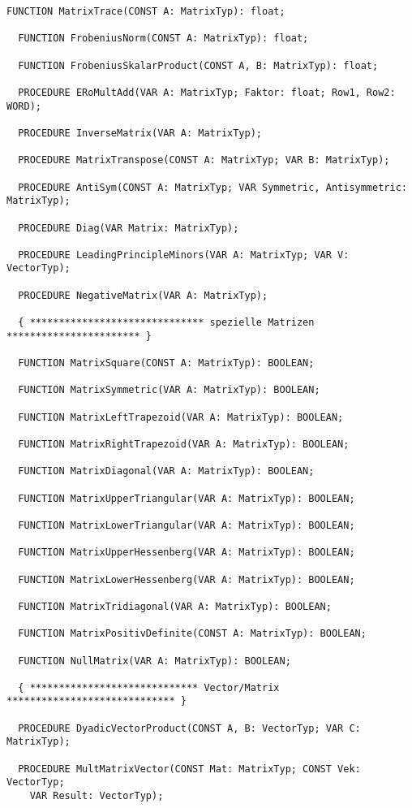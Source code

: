 \begin{refsection}
\begin{lstlisting}[caption=Interface of unit Matrix]
  FUNCTION MatrixTrace(CONST A: MatrixTyp): float;

  FUNCTION FrobeniusNorm(CONST A: MatrixTyp): float;

  FUNCTION FrobeniusSkalarProduct(CONST A, B: MatrixTyp): float;

  PROCEDURE ERoMultAdd(VAR A: MatrixTyp; Faktor: float; Row1, Row2: WORD);

  PROCEDURE InverseMatrix(VAR A: MatrixTyp);

  PROCEDURE MatrixTranspose(CONST A: MatrixTyp; VAR B: MatrixTyp);

  PROCEDURE AntiSym(CONST A: MatrixTyp; VAR Symmetric, Antisymmetric: MatrixTyp);

  PROCEDURE Diag(VAR Matrix: MatrixTyp);

  PROCEDURE LeadingPrincipleMinors(VAR A: MatrixTyp; VAR V: VectorTyp);

  PROCEDURE NegativeMatrix(VAR A: MatrixTyp);

  { ****************************** spezielle Matrizen *********************** }

  FUNCTION MatrixSquare(CONST A: MatrixTyp): BOOLEAN;

  FUNCTION MatrixSymmetric(VAR A: MatrixTyp): BOOLEAN;

  FUNCTION MatrixLeftTrapezoid(VAR A: MatrixTyp): BOOLEAN;

  FUNCTION MatrixRightTrapezoid(VAR A: MatrixTyp): BOOLEAN;

  FUNCTION MatrixDiagonal(VAR A: MatrixTyp): BOOLEAN;

  FUNCTION MatrixUpperTriangular(VAR A: MatrixTyp): BOOLEAN;

  FUNCTION MatrixLowerTriangular(VAR A: MatrixTyp): BOOLEAN;

  FUNCTION MatrixUpperHessenberg(VAR A: MatrixTyp): BOOLEAN;

  FUNCTION MatrixLowerHessenberg(VAR A: MatrixTyp): BOOLEAN;

  FUNCTION MatrixTridiagonal(VAR A: MatrixTyp): BOOLEAN;

  FUNCTION MatrixPositivDefinite(CONST A: MatrixTyp): BOOLEAN;

  FUNCTION NullMatrix(VAR A: MatrixTyp): BOOLEAN;

  { ***************************** Vector/Matrix ***************************** }

  PROCEDURE DyadicVectorProduct(CONST A, B: VectorTyp; VAR C: MatrixTyp);

  PROCEDURE MultMatrixVector(CONST Mat: MatrixTyp; CONST Vek: VectorTyp;
    VAR Result: VectorTyp);


\end{lstlisting}
\end{refsection}
